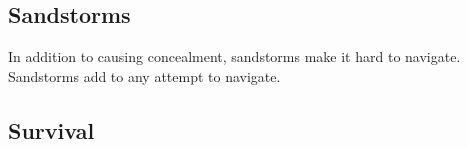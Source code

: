 \subsection{Sandstorms}

In addition to causing concealment, sandstorms make it hard to navigate. Sandstorms add \setback\setback\setback to any attempt to navigate.

\subsection{Survival}

%
